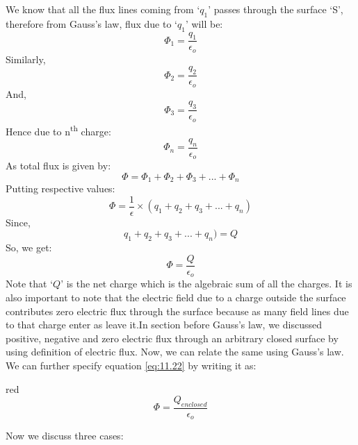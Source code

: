 We know that all the flux lines coming from `$q_{1}$’ passes through the surface `S’,
therefore from Gauss’s law, flux due to `$q_{1}$’ will be:
\begin{equation}
  \Phi_{1} = \frac{q_{1}}{\epsilon_{o}} \nonumber
\end{equation}
Similarly,
\begin{equation}
  \Phi_{2} = \frac{q_{2}}{\epsilon_{o}} \nonumber
\end{equation}
And,
\begin{equation}
  \Phi_{3} = \frac{q_{3}}{\epsilon_{o}} \nonumber
\end{equation}
Hence due to n\textsuperscript{th} charge:
\begin{equation}
  \Phi_{n} = \frac{q_{n}}{\epsilon_{o}} \nonumber
\end{equation}
As total flux is given by:
\begin{equation}
  \Phi =  \Phi_{1}+ \Phi_{2}+ \Phi_{3}+...+ \Phi_{n} \nonumber
\end{equation}
Putting respective values:
\begin{equation}
  \Phi = \frac{1}{\epsilon}\times (q_{1}+q_{2}+q_{3}+...+q_{n}) \nonumber
\end{equation}
Since,
\begin{equation}
  q_{1}+q_{2}+q_{3}+...+q_{n}) = Q \nonumber
\end{equation}
So, we get:
\begin{equation}\label{eq:11.22}
  \Phi = \frac{Q}{\epsilon_{o}}
\end{equation}
Note that `$Q$’ is the net charge which is the algebraic
sum of all the charges. It is also important to note that the
electric field due to a charge outside the surface contributes zero
electric flux through the surface because as many field lines
due to that charge enter as leave it.In section before Gauss’s law,
we discussed positive, negative and zero electric flux through an
arbitrary closed surface by using definition of electric flux.
Now, we can relate the same using Gauss’s law. We can further
specify equation
\ref{eq:11.22} by writing it as:
\begin{mybox}{red}{}
\begin{equation}\label{eq:11.23}
  \Phi = \frac{Q_{enclosed}}{\epsilon_{o}}
\end{equation}
\end{mybox}
Now we discuss three cases:
